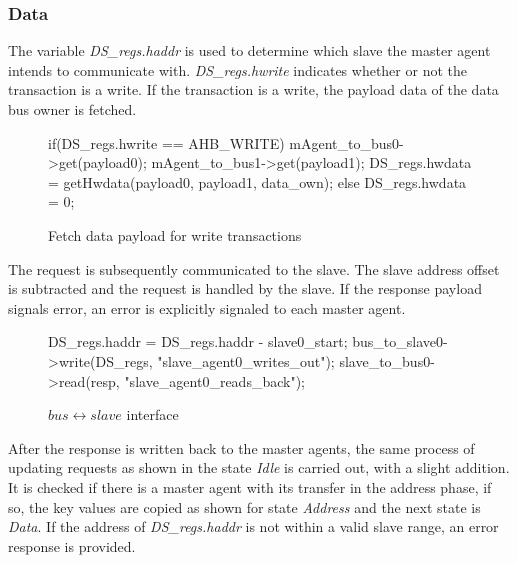 \subsubsection{Data}
The variable \textit{DS\_regs.haddr} is used to determine which slave the master agent intends to communicate with. \textit{DS\_regs.hwrite} indicates whether or not the transaction is a write. If the transaction is a write, the payload data of the data bus owner is fetched.
\begin{figure}[h!]
\begin{C++}
if(DS_regs.hwrite == AHB_WRITE){
mAgent_to_bus0->get(payload0);
mAgent_to_bus1->get(payload1);
DS_regs.hwdata = getHwdata(payload0, payload1, data_own);
}else{
DS_regs.hwdata = 0;
}
\end{C++}  
\caption{Fetch data payload for write transactions}
\label{fig:data-fetch}
\end{figure}

The request is subsequently communicated to the slave. The slave address offset is subtracted and the request is handled by the slave. If the response payload signals error, an error is explicitly signaled to each master agent.
\begin{figure}[h!]
\begin{C++}
DS_regs.haddr = DS_regs.haddr - slave0_start;
bus_to_slave0->write(DS_regs, "slave_agent0_writes_out");
slave_to_bus0->read(resp, "slave_agent0_reads_back");
\end{C++} 
\caption{$bus\leftrightarrow slave$ interface}
\end{figure}

After the response is written back to the master agents, the same process of updating requests as shown in the state \textit{Idle} is carried out, with a slight addition. It is checked if there is a master agent with its transfer in the address phase, if so, the key values are copied as shown for state \textit{Address} and the next state is \textit{Data}. If the address of \textit{DS\_regs.haddr} is not within a valid slave range, an error response is provided.    

\newpage
